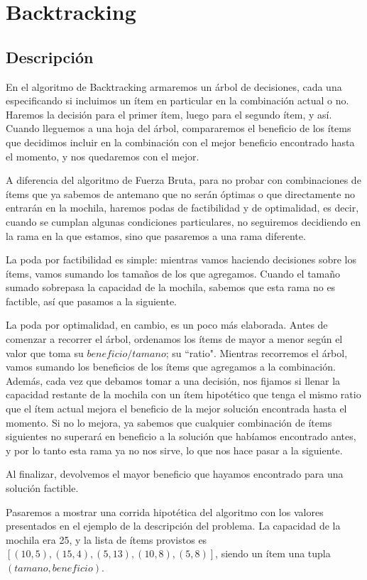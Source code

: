 \documentclass[10pt, a4paper]{article}
\begin{document}
\section{Backtracking}
\subsection{Descripción}
En el algoritmo de Backtracking armaremos un árbol de decisiones, cada una especificando si incluimos un ítem en particular en la combinación actual o no. Haremos la decisión para el primer ítem, luego para el segundo ítem, y así. Cuando lleguemos a una hoja del árbol, compararemos el beneficio de los ítems que decidimos incluir en la combinación con el mejor beneficio encontrado hasta el momento, y nos quedaremos con el mejor.\par
A diferencia del algoritmo de Fuerza Bruta, para no probar con combinaciones de ítems que ya sabemos de antemano que no serán óptimas o que directamente no entrarán en la mochila, haremos podas de factibilidad y de optimalidad, es decir, cuando se cumplan algunas condiciones particulares, no seguiremos decidiendo en la rama en la que estamos, sino que pasaremos a una rama diferente.\par
La poda por factibilidad es simple: mientras vamos haciendo decisiones sobre los ítems, vamos sumando los tamaños de los que agregamos. Cuando el tamaño sumado sobrepasa la capacidad de la mochila, sabemos que esta rama no es factible, así que pasamos a la siguiente.\par
La poda por optimalidad, en cambio, es un poco más elaborada. Antes de comenzar a recorrer el árbol, ordenamos los ítems de mayor a menor según el valor que toma su $beneficio/tamano$; su ``ratio". Mientras recorremos el árbol, vamos sumando los beneficios de los ítems que agregamos a la combinación. Además, cada vez que debamos tomar a una decisión, nos fijamos si llenar la capacidad restante de la mochila con un ítem hipotético que tenga el mismo ratio que el ítem actual mejora el beneficio de la mejor solución encontrada hasta el momento. Si no lo mejora, ya sabemos que cualquier combinación de ítems siguientes no superará en beneficio a la solución que habíamos encontrado antes, y por lo tanto esta rama ya no nos sirve, lo que nos hace pasar a la siguiente.\par
Al finalizar, devolvemos el mayor beneficio que hayamos encontrado para una solución factible.\par
Pasaremos a mostrar una corrida hipotética del algoritmo con los valores presentados en el ejemplo de la descripción del problema. La capacidad de la mochila era 25, y la lista de ítems provistos es $[(10, 5), (15, 4), (5, 13), (10, 8), (5, 8)]$, siendo un ítem una tupla $(tamano, beneficio)$.\par
\end{document}
